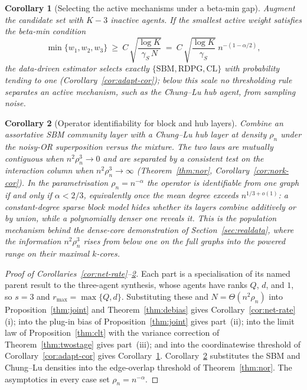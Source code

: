 \documentclass[12pt]{article}
\newtheorem{corollary}{Corollary}
\newcommand{\1}{\mathbf{1}}
\begin{document}
\begin{corollary}[Selecting the active mechanisms under a beta-min gap]
\label{cor:net-select}
Augment the candidate set with $K-3$ inactive agents. If the smallest active weight satisfies the
beta-min condition
\[
\min\{w_1,w_2,w_3\}\ \ge\ C\,\sqrt{\frac{\log K}{\gamma_S\,N}}
\ =\ C\,\sqrt{\frac{\log K}{\gamma_S}}\;n^{-(1-\alpha/2)},
\]
the data-driven estimator selects exactly $\{\mathrm{SBM},\mathrm{RDPG},\mathrm{CL}\}$ with probability
tending to one (Corollary~\ref{cor:adapt-cor}); below this scale no thresholding rule separates an
active mechanism, such as the Chung--Lu hub agent, from sampling noise.
\end{corollary}

\begin{corollary}[Operator identifiability for block and hub layers]
\label{cor:net-operator}
Combine an assortative SBM community layer with a Chung--Lu hub layer at density $\rho_n$ under the
noisy-OR superposition versus the mixture. The two laws are mutually contiguous when
$n^2\rho_n^3\to0$ and are separated by a consistent test on the interaction column when
$n^2\rho_n^3\to\infty$ (Theorem~\ref{thm:nor}, Corollary~\ref{cor:nork-cor}). In the parametrisation
$\rho_n=n^{-\alpha}$ the operator is identifiable from one graph if and only if $\alpha<2/3$,
equivalently once the mean degree exceeds $n^{1/3+o(1)}$: a constant-degree sparse block model hides
whether its layers combine additively or by union, while a polynomially denser one reveals it. This is
the population mechanism behind the dense-core demonstration of Section~\ref{sec:realdata}, where the
information $n^2\rho_n^3$ rises from below one on the full graphs into the powered range on their
maximal $k$-cores.
\end{corollary}

\begin{proof}[Proof of Corollaries~\ref{cor:net-rate}--\ref{cor:net-operator}]
Each part is a specialisation of its named parent result to the three-agent synthesis, whose agents have
ranks $Q$, $d$, and $1$, so $s=3$ and $r_{\max}=\max\{Q,d\}$. Substituting these and $N=\Theta(n^2\rho_n)$
into Proposition~\ref{thm:joint} and Theorem~\ref{thm:debias} gives Corollary~\ref{cor:net-rate}(i); into the
plug-in bias of Proposition~\ref{thm:joint} gives part~(ii); into the limit law of Proposition~\ref{thm:clt}
with the variance correction of Theorem~\ref{thm:twostage} gives part~(iii); and into the coordinatewise
threshold of Corollary~\ref{cor:adapt-cor} gives Corollary~\ref{cor:net-select}.
Corollary~\ref{cor:net-operator} substitutes the SBM and Chung--Lu densities into the edge-overlap threshold
of Theorem~\ref{thm:nor}. The asymptotics in every case set $\rho_n=n^{-\alpha}$.
\end{proof}
\end{document}
